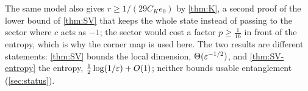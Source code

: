 The same model also gives $r\ge1/(29C_Ke_0)$ by \cref{thm:K}, a second proof of the lower bound of \cref{thm:SV} that
keeps the whole state instead of passing to the sector where $c$ acts as $-1$; the sector would cost a factor $p\ge\frac1{16}$
in front of the entropy, which is why the corner map is used here. The two results are different statements: \cref{thm:SV} bounds the
local dimension, $\Theta(\varepsilon^{-1/2})$, and \cref{thm:SV-entropy} the entropy, $\frac12\log(1/\varepsilon)+O(1)$; neither bounds usable
entanglement (\cref{sec:status}).
